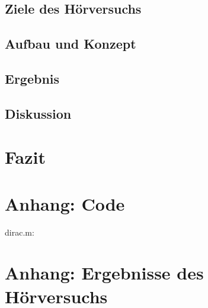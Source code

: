 \documentclass[12pt, a4paper]{article}
\begin{document}
    \subsection{Ziele des Hörversuchs}
    
    \subsection{Aufbau und Konzept}
    \label{aufbau_und_konzept}
    
    \subsection{Ergebnis}
    
    \subsection{Diskussion}
    

\section{Fazit}





\newpage
\appendix
\section{Anhang: Code}
dirac.m:


\newpage

\section{Anhang: Ergebnisse des Hörversuchs}


\end{document}
